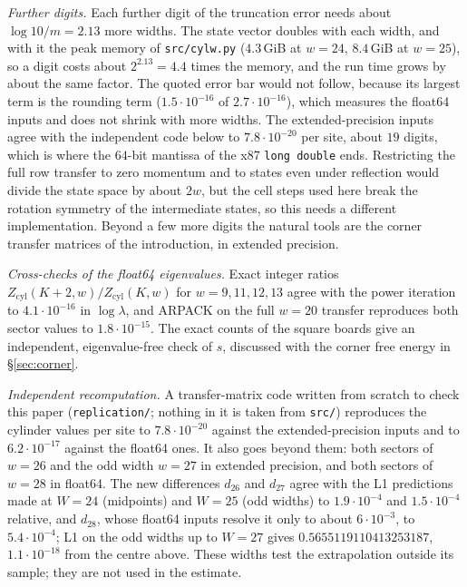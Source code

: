 \documentclass[11pt]{amsart}
\theoremstyle{definition}
\theoremstyle{remark}
\newcommand{\file}[1]{\texttt{#1}}
\begin{document}
\emph{Further digits.} Each further digit of the truncation error needs about $\log 10/m = 2.13$
more widths. The state vector doubles with each width, and with it the peak memory of
\file{src/cylw.py} ($4.3$\,GiB at $w = 24$, $8.4$\,GiB at $w = 25$), so a digit costs about
$2^{2.13} = 4.4$ times the memory, and the run time grows by about the same factor. The quoted error
bar would not follow, because its largest term is the rounding term ($1.5\cdot10^{-16}$ of
$2.7\cdot10^{-16}$), which measures the float64 inputs and does not shrink with more widths. The
extended-precision inputs agree with the independent code below to $7.8\cdot10^{-20}$ per site, about
$19$ digits, which is where the $64$-bit mantissa of the x87 \texttt{long double} ends. Restricting the full row transfer to zero momentum and to states even under reflection would
divide the state space by about $2w$, but the cell steps used here break the rotation symmetry of the
intermediate states, so this needs a different implementation. Beyond a few more digits the natural
tools are the corner transfer matrices of the introduction, in extended precision.

\emph{Cross-checks of the float64 eigenvalues.} Exact integer ratios
$Z_{\mathrm{cyl}}(K+2, w)/Z_{\mathrm{cyl}}(K, w)$ for $w = 9, 11, 12, 13$ agree with the power
iteration to $4.1\cdot10^{-16}$ in $\log \lambda$, and ARPACK on the full $w = 20$ transfer
reproduces both sector values to $1.8\cdot10^{-15}$. The exact counts of the square boards give an
independent, eigenvalue-free check of $s$, discussed with the corner free energy in
\S\ref{sec:corner}.

\emph{Independent recomputation.} A transfer-matrix code written from scratch to check this paper
(\file{replication/}; nothing in it is taken from \file{src/}) reproduces the cylinder values per site to
$7.8\cdot10^{-20}$ against the extended-precision inputs and to $6.2\cdot10^{-17}$ against the float64
ones. It also goes beyond them: both sectors of $w = 26$ and the odd width $w = 27$ in extended
precision, and both sectors of $w = 28$ in float64. The new differences $d_{26}$ and $d_{27}$ agree
with the L1 predictions made at $W = 24$ (midpoints) and $W = 25$ (odd widths) to $1.9\cdot10^{-4}$ and
$1.5\cdot10^{-4}$ relative, and $d_{28}$, whose float64 inputs resolve it only to about
$6\cdot10^{-3}$, to $5.4\cdot10^{-4}$; L1 on the odd widths up to
$W = 27$ gives $0.5655119110413253187$, $1.1\cdot10^{-18}$ from the centre above. These widths test the
extrapolation outside its sample; they are not used in the estimate.
\end{document}
